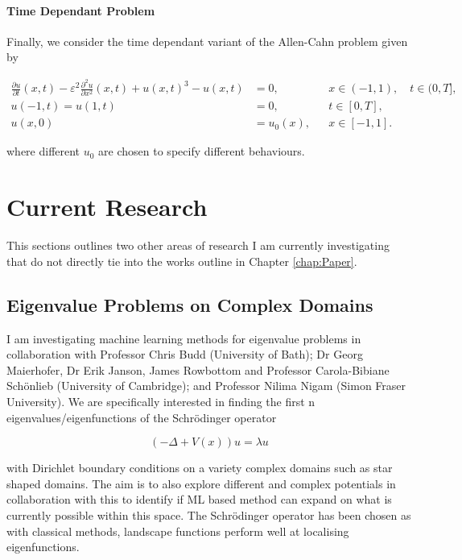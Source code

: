 \documentclass[11pt, onecolumn]{report}
\begin{document}
\subsubsection{Time Dependant Problem}
Finally, we consider the time dependant variant of the Allen-Cahn problem given by 

\begin{align*}
    \frac{\partial u}{\partial t}(x,t)
    - \varepsilon^2 \frac{\partial^2 u}{\partial x^2}(x,t)
    + u(x,t)^3 - u(x,t) &= 0,
    && x\in(-1,1),\quad t\in(0,T], \\[10pt]
    u(-1,t)=u(1,t) &= 0,
    && t\in[0,T], \\
    u(x,0) &= u_0(x),
    && x\in[-1,1].
\end{align*}

where different $u_0$ are chosen to specify different behaviours. 




\chapter{Current Research}
\label{chap:CurrentResearch}

This sections outlines two other areas of research I am currently investigating that do not directly tie into the works outline in Chapter \ref{chap:Paper}. 
\section{Eigenvalue Problems on Complex Domains}
\label{sec:Eigenvalue}

I am investigating machine learning methods for eigenvalue problems in collaboration with Professor Chris Budd (University of Bath); Dr Georg Maierhofer, Dr Erik Janson, James Rowbottom and Professor Carola-Bibiane Sch\"{o}nlieb (University of Cambridge); and Professor Nilima Nigam (Simon Fraser University). We are specifically interested in finding the first n eigenvalues/eigenfunctions of the Schr\"{o}dinger operator

\begin{equation*}
	(-\Delta + V(x)) u = \lambda u
\end{equation*}

with Dirichlet boundary conditions on a variety complex domains such as star shaped domains. The aim is to also explore different and complex potentials in collaboration with this to identify if ML based method can expand on what is currently possible within this space. The Schr\"odinger operator has been chosen as with classical methods, landscape functions perform well at localising eigenfunctions.
\end{document}
